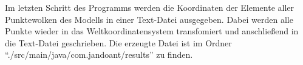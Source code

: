Im letzten Schritt des Programms werden die Koordinaten der Elemente aller Punktewolken des Modells in einer Text-Datei ausgegeben. Dabei werden alle Punkte wieder in das Weltkoordinatensystem transfomiert und anschließend in die Text-Datei geschrieben. Die erzeugte Datei ist im Ordner {"`./src/\-main/\-java/\-com.jandoant/results"'} zu finden.  

 






         




    




           




           


       

        








    













  
